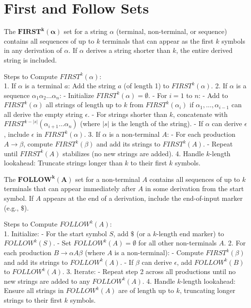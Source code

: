 \section{First and Follow Sets}

The $\mathbf{FIRST^k(\alpha)}$ set for a string $\alpha$ (terminal, non-terminal, or sequence) contains all sequences of up to $k$ terminals that can appear as the first $k$ symbols in any derivation of $\alpha$. If $\alpha$ derives a string shorter than $k$, the entire derived string is included.

Steps to Compute $FIRST^k(\alpha)$:\\
1. If $\alpha$ is a terminal $a$: Add the string $a$ (of length 1) to $FIRST^k(\alpha)$.
2. If $\alpha$ is a sequence $\alpha_1 \alpha_2 \dots \alpha_n$:
   - Initialize $FIRST^k(\alpha) = \emptyset$.
   - For $i = 1$ to $n$:
     - Add to $FIRST^k(\alpha)$ all strings of length up to $k$ from $FIRST^k(\alpha_i)$ if $\alpha_1, \dots, \alpha_{i-1}$ can all derive the empty string $\epsilon$.
     - For strings shorter than $k$, concatenate with $FIRST^{k-|s|}(\alpha_{i+1} \dots \alpha_n)$ (where $|s|$ is the length of the string).
   - If $\alpha$ can derive $\epsilon$, include $\epsilon$ in $FIRST^k(\alpha)$.
3. If $\alpha$ is a non-terminal $A$:
   - For each production $A \to \beta$, compute $FIRST^k(\beta)$ and add its strings to $FIRST^k(A)$.
   - Repeat until $FIRST^k(A)$ stabilizes (no new strings are added).
4. Handle $k$-length lookahead: Truncate strings longer than $k$ to their first $k$ symbols.

The $\mathbf{FOLLOW^k(A)}$ set for a non-terminal $A$ contains all sequences of up to $k$ terminals that can appear immediately after $A$ in some derivation from the start symbol. If $A$ appears at the end of a derivation, include the end-of-input marker (e.g., $\$$).

Steps to Compute $FOLLOW^k(A)$:\\
1. Initialize:
   - For the start symbol $S$, add $\$$ (or a $k$-length end marker) to $FOLLOW^k(S)$.
   - Set $FOLLOW^k(A) = \emptyset$ for all other non-terminals $A$.
2. For each production $B \to \alpha A \beta$ (where $A$ is a non-terminal):
   - Compute $FIRST^k(\beta)$ and add its strings to $FOLLOW^k(A)$.
   - If $\beta$ can derive $\epsilon$, add $FOLLOW^k(B)$ to $FOLLOW^k(A)$.
3. Iterate:
   - Repeat step 2 across all productions until no new strings are added to any $FOLLOW^k(A)$.
4. Handle $k$-length lookahead: Ensure all strings in $FOLLOW^k(A)$ are of length up to $k$, truncating longer strings to their first $k$ symbols.




